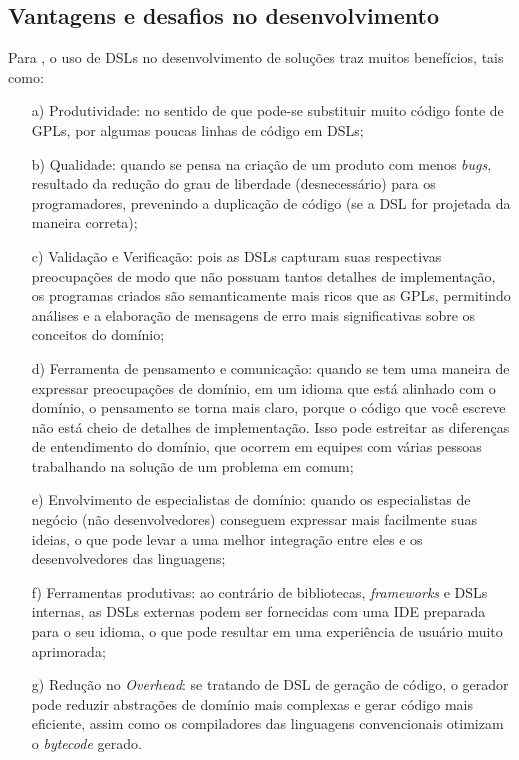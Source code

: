 \subsection{Vantagens e desafios no desenvolvimento}
\label{beneficiosdsl}

Para , o uso de \gls{DSL}s no desenvolvimento de soluções traz muitos benefícios, tais como:

\begin{enumerate}
    \item[a)] Produtividade: no sentido de que pode-se substituir muito código fonte de \gls{GPL}s, por algumas poucas linhas de código em \gls{DSL}s;
    
    \item[b)] Qualidade: quando se pensa na criação de um produto com menos \textit{bugs}, resultado da redução do grau de liberdade (desnecessário) para os programadores, prevenindo a duplicação de código (se a \gls{DSL} for projetada da maneira correta);
    
    \item[c)] Validação e Verificação: pois as \gls{DSL}s capturam suas respectivas preocupações de modo que não possuam tantos detalhes de implementação, os programas criados são semanticamente mais ricos que as \gls{GPL}s, permitindo análises e a elaboração de mensagens de erro mais significativas sobre os conceitos do domínio;
    
    \item[d)] Ferramenta de pensamento e comunicação: quando se tem uma maneira de expressar preocupações de domínio, em um idioma que está alinhado com o domínio, o pensamento se torna mais claro, porque o código que você escreve não está cheio de detalhes de implementação. Isso pode estreitar as diferenças de entendimento do domínio, que ocorrem em equipes com várias pessoas trabalhando na solução de um problema em comum;
    
    \item[e)] Envolvimento de especialistas de domínio: quando os especialistas de negócio (não desenvolvedores) conseguem expressar mais facilmente suas ideias, o que pode levar a uma melhor integração entre eles e os desenvolvedores das linguagens;
    
    \item[f)] Ferramentas produtivas: ao contrário de bibliotecas, \textit{frameworks} e \gls{DSL}s internas, as \gls{DSL}s externas podem ser fornecidas com uma \gls{IDE} preparada para o seu idioma, o que pode resultar em uma experiência de usuário muito aprimorada;

    \item[g)] Redução no \textit{Overhead}: se tratando de \gls{DSL} de geração de código, o gerador pode reduzir abstrações de domínio mais complexas e gerar código mais eficiente, assim como os compiladores das linguagens convencionais otimizam o \textit{bytecode} gerado.
\end{enumerate}

